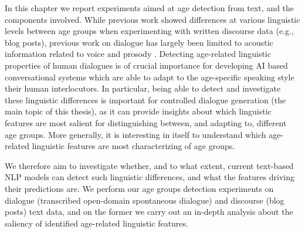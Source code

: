 
In this chapter we report experiments aimed at age detection from text, and the components involved. 
While previous work showed differences at various linguistic levels between age groups when experimenting with written discourse data (e.g., blog posts), previous work on dialogue has largely been limited to acoustic information related to voice and prosody \citep{wolters2009age, li2013automatic}.
Detecting age-related linguistic properties of human dialogues is of crucial importance for developing AI based conversational systems which are able to adapt to the age-specific speaking style their human interlocutors. In particular, being able to detect and investigate these linguistic differences is important for controlled dialogue generation (the main topic of this thesis), as it can provide insights about which linguistic features are most salient for distinguishing between, and adapting to, different age groups. More generally, it is interesting in itself to understand which age-related linguistic features are most characterizing of age groups. 

We therefore aim to investigate whether, and to what extent, current text-based NLP models can detect such linguistic differences, and what the features driving their predictions are. We perform our age groups detection experiments on dialogue (transcribed open-domain spontaneous dialogue) and discourse (blog posts) text data, and on the former we carry out an in-depth analysis about the saliency of identified age-related linguistic features.


